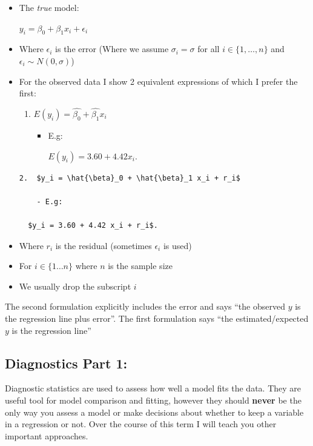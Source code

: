 \documentclass[
]{gitbook}
\begin{document}
\begin{itemize}
\item
  The \emph{true} model:

  \(y_i = \beta_0 + \beta_1 x_i + \epsilon_i\)
\item
  Where \(\epsilon_i\) is the error (Where we assume \(\sigma_i = \sigma\) for all \(i \in \{1,\ldots,n\}\) and \(\epsilon_i \sim N(0,\sigma)\))
\item
  For the observed data I show 2 equivalent expressions of which I prefer the first:

  \begin{enumerate}
  \def\labelenumi{\arabic{enumi}.}
  \item
    \(E(y_i) = \hat{\beta_0} + \hat{\beta_1} x_i\)

    \begin{itemize}
    \item
      E.g:

      \(E(y_i) = 3.60 + 4.42 x_i\).
    \end{itemize}
  \end{enumerate}

\begin{verbatim}
2.  $y_i = \hat{\beta}_0 + \hat{\beta}_1 x_i + r_i$

    - E.g: 

  $y_i = 3.60 + 4.42 x_i + r_i$. 
\end{verbatim}
\item
  Where \(r_i\) is the residual (sometimes \(\epsilon_i\) is used)
\item
  For \(i \in \{1 \ldots n\}\) where \(n\) is the sample size
\item
  We usually drop the subscript \(i\)
\end{itemize}

The second formulation explicitly includes the error and says ``the observed \(y\) is the regression line plus error''. The first formulation says ``the estimated/expected \(y\) is the regression line''

\hypertarget{diagnostics-part-1}{%
\subsection{Diagnostics Part 1:}\label{diagnostics-part-1}}

Diagnostic statistics are used to assess how well a model fits the data. They are useful tool for model comparison and fitting, however they should \textbf{never} be the only way you assess a model or make decisions about whether to keep a variable in a regression or not. Over the course of this term I will teach you other important approaches.
\end{document}
